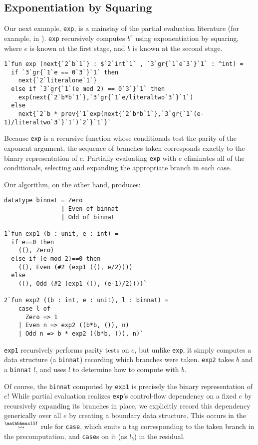 \subsection{Exponentiation by Squaring}

Our next example, \texttt{exp}, is a mainstay of the partial evaluation
literature (for example, in \cite{jones96}). \texttt{exp} recursively computes
$b^e$ using exponentiation by squaring, where $e$ is known at the first stage,
and $b$ is known at the second stage. 
%
\begin{lstlisting} 
1`fun exp (next{`2`b`1`} : $`2`int`1` , `3`gr{`1`e`3`}`1` : ^int) = 
  if `3`gr{`1`e == 0`3`}`1` then 
    next{`2`literalone`1`}
  else if `3`gr{`1`(e mod 2) == 0`3`}`1` then
    exp(next{`2`b*b`1`},`3`gr{`1`e/literaltwo`3`}`1`)
  else 
    next{`2`b * prev{`1`exp(next{`2`b*b`1`},`3`gr{`1`(e-1)/literaltwo`3`}`1`)`2`}`1`}`
\end{lstlisting}
%
Because \texttt{exp} is a recursive function whose conditionals test the parity
of the exponent argument, the sequence of branches taken corresponds exactly to
the binary representation of $e$. Partially evaluating \texttt{exp} with $e$
eliminates all of the conditionals, selecting and expanding the appropriate
branch in each case.

Our algorithm, on the other hand, produces:
%
\begin{lstlisting} 
datatype binnat = Zero
                | Even of binnat 
                | Odd of binnat

1`fun exp1 (b : unit, e : int) =
  if e==0 then
    ((), Zero)
  else if (e mod 2)==0 then 
    ((), Even (#2 (exp1 ((), e/2))))
  else 
    ((), Odd (#2 (exp1 ((), (e-1)/2))))`

2`fun exp2 ((b : int, e : unit), l : binnat) =
    case l of
      Zero => 1
    | Even n => exp2 ((b*b, ()), n)
    | Odd n => b * exp2 ((b*b, ()), n)`
\end{lstlisting}
%
\texttt{exp1} recursively performs parity tests on $e$, but unlike \texttt{exp},
it simply computes a data structure (a \texttt{binnat}) recording which branches
were taken. \texttt{exp2} takes $b$ and a \texttt{binnat} $l$, and uses $l$ to
determine how to compute with $b$.

Of course, the \texttt{binnat} computed by \texttt{exp1} is precisely the binary
representation of $e$! While partial evaluation realizes \texttt{exp}'s
control-flow dependency on a fixed $e$ by recursively expanding its branches in
place, we explicitly record this dependency generically over all $e$ by creating
a boundary data structure. This occurs in the $\splitonesym$ rule for
\texttt{case}, which emits a tag corresponding to the taken branch in the
precomputation, and \texttt{case}s on it (as $l_b$) in the residual.

